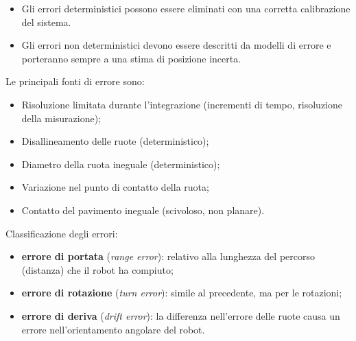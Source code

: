 \documentclass[a4paper,portrait,12pt]{article}
\theoremstyle{definition}
\begin{document}
\begin{itemize}
\item Gli errori deterministici possono essere eliminati con una corretta calibrazione del sistema.
\item Gli errori non deterministici devono essere descritti da modelli di errore e porteranno sempre a una stima di posizione incerta.
\end{itemize}

Le principali fonti di errore sono:
\begin{itemize}
\item Risoluzione limitata durante l'integrazione (incrementi di tempo, risoluzione della misurazione);
\item Disallineamento delle ruote (deterministico);
\item Diametro della ruota ineguale (deterministico);
\item Variazione nel punto di contatto della ruota;
\item Contatto del pavimento ineguale (scivoloso, non planare).
\end{itemize}

Classificazione degli errori:
\begin{itemize}
\item \textbf{errore di portata} (\emph{range error}): relativo alla lunghezza del percorso (distanza) che il robot ha compiuto; 
\item \textbf{errore di rotazione} (\emph{turn error}): simile al precedente, ma per le rotazioni;
\item \textbf{errore di deriva} (\emph{drift error}): la differenza nell'errore delle ruote causa un errore nell'orientamento angolare del robot.
\end{itemize}
\end{document}
